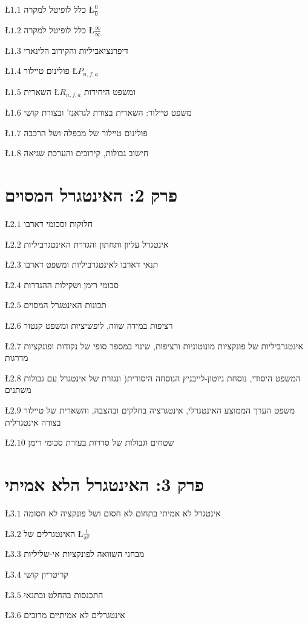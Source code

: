 \documentclass[english,hebrew]{article}
\begin{document}
\L{$1.1$} כלל לופיטל למקרה \L{$\frac{0}{0}$}

\L{$1.2$} כלל לופיטל למקרה \L{$\frac{\infty}{\infty}$}

\L{$1.3$} דיפרנציאביליות והקירוב הלינארי

\L{$1.4$} פולינום טיילור \L{$P_{n,f,a}$}

\L{$1.5$} השארית \L{$R_{n,f,a}$} ומשפט היחידות

\L{$1.6$} משפט טיילור: השארית בצורת לגראנז' ובצורת קושי

\L{$1.7$} פולינום טיילור של מכפלה ושל הרכבה

\L{$1.8$} חישוב גבולות, קירובים והערכת שגיאה

\section{פרק 2: האינטגרל המסוים}

\L{$2.1$} חלוקות וסכומי דארבו

\L{$2.2$} אינטגרל עליון ותחתון והגדרת האינטגרביליות

\L{$2.3$} תנאי דארבו לאינטגרביליות ומשפט דארבו

\L{$2.4$} סכומי רימן ושקילות ההגדרות

\L{$2.5$} תכונות האינטגרל המסוים

\L{$2.6$} רציפות במידה שווה, ליפשיציות ומשפט קנטור

\L{$2.7$} אינטגרביליות של פונקציות מונוטוניות ורציפות, שינוי במספר
סופי של נקודות ופונקציות מדרגות

\L{$2.8$} המשפט היסודי, נוסחת ניוטון-לייבניץ הנוסחה היסודית( ונגזרת
של אינטגרל עם גבולות משתנים

\L{$2.9$} משפט הערך הממוצע האינטגרלי, אינטגרציה בחלקים ובהצבה, והשארית
של טיילור בצורה אינטגרלית

\L{$2.10$} שטחים וגבולות של סדרות בעזרת סכומי רימן

\section{פרק 3: האינטגרל הלא אמיתי}

\L{$3.1$} אינטגרל לא אמיתי בתחום לא חסום ושל פונקציה לא חסומה

\L{$3.2$} האינטגרלים של \L{$\frac{1}{x^{p}}$}

\L{$3.3$} מבחני השוואה לפונקציות אי-שליליות

\L{$3.4$} קריטריון קושי

\L{$3.5$} התכנסות בהחלט ובתנאי

\L{$3.6$} אינטגרלים לא אמיתיים מרובים
\end{document}
